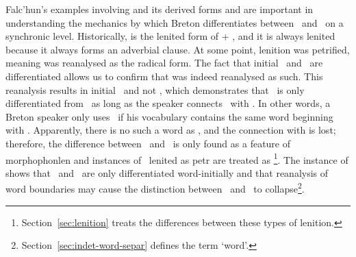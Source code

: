 Falc'hun's examples involving  and its derived forms  and   are important in understanding the mechanics by which Breton differentiates between \xD\ and \lT\ on a synchronic level. Historically,  is the lenited form of  + , and it is always lenited because it always forms an adverbial clause. At some point, lenition was petrified, meaning   was reanalysed as the radical form. The fact that initial \xD\ and \lT\ are differentiated  allows us to confirm that  was indeed reanalysed as such. This reanalysis results in initial \xD\ and not \lT, which demonstrates that \lT\ is only differentiated from \xD\ as long as the speaker connects \lT\ with \xT. In other words, a Breton speaker only uses \lT\ if his vocabulary contains the same word beginning with \xT. Apparently, there is no such a word as , and the connection with  is lost; therefore, the difference between \lT\ and \xD\ is only found as a feature of \gls{morphophonlen} and instances of \lT\ lenited as \gls{petr} are treated as \xD\footnote{ Section~\ref{sec:lenition} treats the differences between these types of lenition.}. The instance of  shows  that \lT\ and \xD\ are only differentiated word-initially and that reanalysis of word boundaries may cause the distinction between \lT\ and \xD\ to collapse\footnote{Section~\ref{sec:indet-word-separ} defines the term `word'.}.






